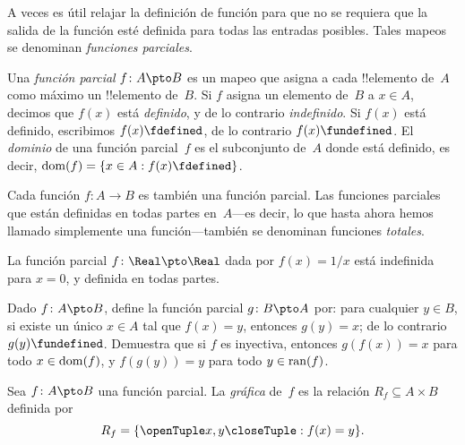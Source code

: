 \documentclass[../../../include/open-logic-section]{subfiles}
\begin{document}


\begin{explain}
A veces es útil relajar la definición de función para que no se
requiera que la salida de la función esté definida para todas las
entradas posibles. Tales mapeos se denominan \emph{funciones parciales}.
\end{explain}

\begin{defn}
Una \emph{función parcial} $f \colon A \pto B$ es un mapeo que
asigna a cada !!{elemento} de~$A$ como máximo un !!{elemento} de~$B$.
Si $f$ asigna un elemento de~$B$ a $x \in A$, decimos que $f(x)$ está
\emph{definido}, y de lo contrario \emph{indefinido}. Si $f(x)$ está definido,
escribimos $f(x) \fdefined$, de lo contrario $f(x) \fundefined$. El
\emph{dominio} de una función parcial~$f$ es el subconjunto de~$A$ donde está
definido, es decir, $\dom{f} = \Setabs{x \in A}{f(x) \fdefined}$.
\end{defn}

\begin{ex}
Cada función $f\colon A \to B$ es también una función parcial. Las
funciones parciales que están definidas en todas partes en~$A$---es decir, lo que
hasta ahora hemos llamado simplemente una función---también se denominan funciones \emph{totales}.
\end{ex}

\begin{ex}
La función parcial $f \colon \Real \pto \Real$ dada por $f(x) = 1/x$
está indefinida para $x = 0$, y definida en todas partes.
\end{ex}

\begin{prob}
Dado $f\colon A \pto B$, define la función parcial $g\colon B \pto
A$ por: para cualquier $y \in B$, si existe un único $x \in A$ tal que
$f(x) = y$, entonces $g(y) = x$; de lo contrario $g(y) \fundefined$. Demuestra que si $f$ es inyectiva, entonces $g(f(x)) = x$ para todo $x \in \mathrm{dom}(f)$, y $f(g(y)) = y$ para todo $y \in \mathrm{ran}(f)$.
\end{prob}

\begin{defn}
Sea $f\colon A \pto B$ una función parcial. La \emph{gráfica} de~$f$
es la relación $R_f \subseteq A \times B$ definida por
\[
R_f = \Setabs{\tuple{x,y}}{f(x) = y}.
\]
\end{defn}
\end{document}
